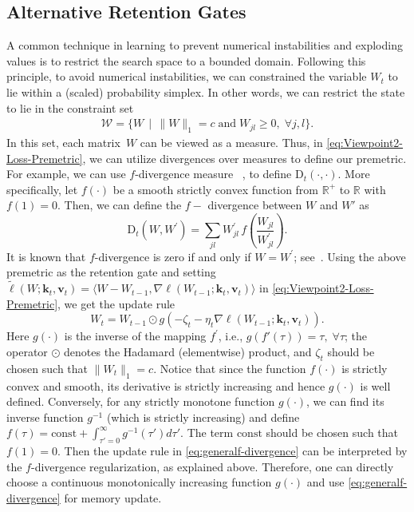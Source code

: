 \documentclass{article}
\newcommand{\citep}{\parencite}
\newcommand{\vk}[0]{\mathbf{k}}
\newcommand{\vvv}[0]{\mathbf{v}}
\newcommand{\cW}[0]{\mathcal{W}}
\theoremstyle{plain}
\theoremstyle{definition}
\theoremstyle{remark}
\newcommand{\head}[1]{\vspace{1.7mm}\noindent{{\textcolor{c2}{\bf #1.}}}}
\begin{document}
\subsection{Alternative Retention Gates}\label{app:variants}

\head{Variant 1: Memorization Over A Scaled Probability Simplex Via $f$-Divergence} 
A common technique in learning to prevent numerical instabilities and exploding values is to restrict the search space to a bounded domain. Following this principle, to avoid numerical instabilities,  we can constrained the variable $W_t$ to lie within a (scaled) probability simplex. In other words, we can restrict the state to lie in the constraint set 
\begin{align*}
    \cW = \{W\, \mid \, \|W\|_1 = c \; \textrm {and} \; W_{jl} \geq 0, \;\forall j,l\}.
\end{align*}
In this set, each matrix~$W$ can be viewed as a measure. Thus, in \eqref{eq:Viewpoint2-Loss-Premetric}, we can utilize divergences over measures to define our premetric. For example,  we can use $f$-divergence measure ~\citep[Def 4.9]{polyanskiy2025information}, \citep{csiszar1967information} to define $\mbox{D}_t(\cdot,\cdot)$. More specifically, let $f(\cdot)$ be a smooth strictly convex function from $\mathbb{R}^+$ to $\mathbb{R}$ with $f(1)=0$. Then, we can define the $f-$ divergence between $W$ and $W'$ as
\[
\mbox{D}_t (W,W^\prime) = \sum_{jl} W^{\prime}_{jl} \, f\left(\frac{W_{jl}}{W^{\prime}_{jl}}\right).
\]
It is known that $f$-divergence is zero if and only if $W = W^\prime$; see~\cite[Theorem 2.3]{polyanskiy2025information}. Using the above premetric as the retention gate and setting $\widetilde{\ell}(W;\vk_t, \vvv_t) = \langle W-W_{t-1}, \nabla \ell(W_{t-1};\vk_t, \vvv_t)\rangle$ in \eqref{eq:Viewpoint2-Loss-Premetric}, we get the update rule
\begin{equation}
\label{eq:generalf-divergence}
W_t = W_{t-1} \odot g\left( -\zeta_t - \eta_t \nabla \ell(W_{t-1};\vk_t, \vvv_t)\right).
\end{equation}
Here $g(\cdot)$ is the inverse of the mapping $f^{\prime}$, i.e., $g(f' (\tau)) =\tau,\;\forall \tau$; the operator $\odot$ denotes the Hadamard (elementwise) product, and $\zeta_t$ should be chosen such that $\|W_t\|_1 = c$. Notice that since the function $f(\cdot)$ is strictly convex and smooth, its derivative is strictly increasing and hence $g(\cdot)$ is well defined. Conversely, for any strictly monotone  function $g(\cdot)$, we can find its inverse function $g^{-1}$ (which is strictly increasing)  and define $f(\tau) =  \textrm{const}+\int_{\tau' = 0}^{\infty} g^{-1}(\tau') d\tau'$. The term $\textrm{const}$ should be chosen such that $f(1) = 0$. Then the update rule in \eqref{eq:generalf-divergence} can be interpreted by the $f$-divergence regularization, as explained above. Therefore, one can directly choose a continuous monotonically increasing function $g(\cdot)$ and use \eqref{eq:generalf-divergence} for memory update. 
\end{document}
